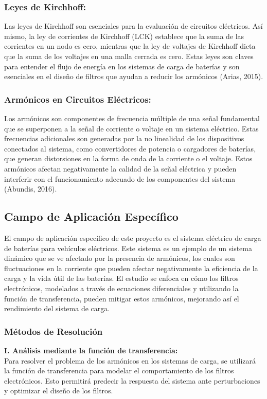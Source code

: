 \subsubsection{ Leyes de Kirchhoff:}
Las leyes de Kirchhoff son esenciales para la evaluación de circuitos eléctricos. Así mismo,
la ley de corrientes de Kirchhoff (LCK) establece que la suma de las corrientes en un nodo es
cero, mientras que la ley de voltajes de Kirchhoff dicta que la suma de los voltajes en una
malla cerrada es cero. Estas leyes son claves para entender el flujo de energía en los sistemas
de carga de baterías y son esenciales en el diseño de filtros que ayudan a reducir los
armónicos (Arias, 2015).
\newpage
\subsubsection{ Armónicos en Circuitos Eléctricos:}
Los armónicos son componentes de frecuencia múltiple de una señal fundamental que se
superponen a la señal de corriente o voltaje en un sistema eléctrico. Estas frecuencias
adicionales son generadas por la no linealidad de los dispositivos conectados al sistema,
como convertidores de potencia o cargadores de baterías, que generan distorsiones en la
forma de onda de la corriente o el voltaje. Estos armónicos afectan negativamente la calidad
de la señal eléctrica y pueden interferir con el funcionamiento adecuado de los componentes
del sistema (Abundis, 2016).

\subsection{ Campo de Aplicación Específico}
El campo de aplicación específico de este proyecto es el sistema eléctrico de carga de
baterías para vehículos eléctricos. Este sistema es un ejemplo de un sistema dinámico que se
ve afectado por la presencia de armónicos, los cuales son fluctuaciones en la corriente que
pueden afectar negativamente la eficiencia de la carga y la vida útil de las baterías. El estudio
se enfoca en cómo los filtros electrónicos, modelados a través de ecuaciones diferenciales y
utilizando la función de transferencia, pueden mitigar estos armónicos, mejorando así el
rendimiento del sistema de carga.

\subsubsection{ Métodos de Resolución}

\textbf{I. Análisis mediante la función de transferencia:}\\
Para resolver el problema de los armónicos en los sistemas de carga, se utilizará la
función de transferencia para modelar el comportamiento de los filtros electrónicos.
Esto permitirá predecir la respuesta del sistema ante perturbaciones y optimizar el
diseño de los filtros.

